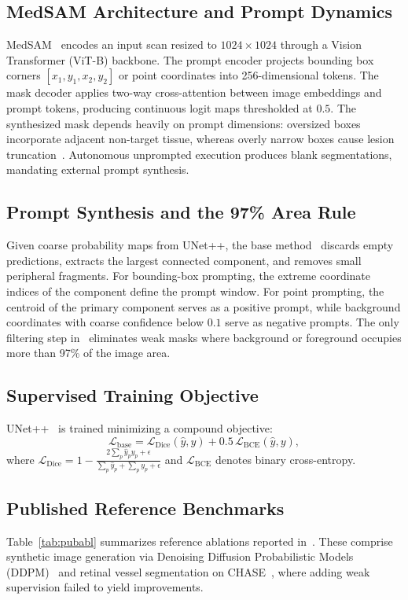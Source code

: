 \documentclass[journal,11pt,onecolumn,draftclsnofoot]{IEEEtran}
\begin{document}
\subsection{MedSAM Architecture and Prompt Dynamics}
MedSAM~\cite{ma2023medsam} encodes an input scan resized to $1024 \times 1024$ through a Vision Transformer (ViT-B) backbone. The prompt encoder projects bounding box corners $[x_1, y_1, x_2, y_2]$ or point coordinates into 256-dimensional tokens. The mask decoder applies two-way cross-attention between image embeddings and prompt tokens, producing continuous logit maps thresholded at $0.5$. The synthesized mask depends heavily on prompt dimensions: oversized boxes incorporate adjacent non-target tissue, whereas overly narrow boxes cause lesion truncation~\cite{deshpande2024}. Autonomous unprompted execution produces blank segmentations, mandating external prompt synthesis.

\subsection{Prompt Synthesis and the 97\% Area Rule}
Given coarse probability maps from UNet++, the base method~\cite{deshpande2024} discards empty predictions, extracts the largest connected component, and removes small peripheral fragments. For bounding-box prompting, the extreme coordinate indices of the component define the prompt window. For point prompting, the centroid of the primary component serves as a positive prompt, while background coordinates with coarse confidence below $0.1$ serve as negative prompts. The only filtering step in~\cite{deshpande2024} eliminates weak masks where background or foreground occupies more than 97\% of the image area.

\subsection{Supervised Training Objective}
UNet++~\cite{zhou2018} is trained minimizing a compound objective:
\begin{equation}
\mathcal{L}_{\text{base}} = \mathcal{L}_{\text{Dice}}(\hat{y}, y) + 0.5\,\mathcal{L}_{\text{BCE}}(\hat{y}, y),
\label{eq:baseloss}
\end{equation}
where $\mathcal{L}_{\text{Dice}} = 1 - \frac{2\sum_p \hat{y}_p y_p + \epsilon}{\sum_p \hat{y}_p + \sum_p y_p + \epsilon}$ and $\mathcal{L}_{\text{BCE}}$ denotes binary cross-entropy.

\subsection{Published Reference Benchmarks}
\label{subsec:pubabl}
Table~\ref{tab:pubabl} summarizes reference ablations reported in~\cite{deshpande2024}. These comprise synthetic image generation via Denoising Diffusion Probabilistic Models (DDPM)~\cite{ho2020,wolleb2021} and retinal vessel segmentation on CHASE~\cite{fraz2012}, where adding weak supervision failed to yield improvements.
\end{document}
